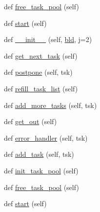 \begin{DoxyCompactItemize}
\item 
def \hyperlink{classwaflib_1_1_runner_1_1_parallel_aed9785fdb3b1d54bbdc5520942ebe237}{free\+\_\+task\+\_\+pool} (self)
\item 
def \hyperlink{classwaflib_1_1_runner_1_1_parallel_a091adebadfabd759640c7347de4b05e2}{start} (self)
\item 
def \hyperlink{classwaflib_1_1_runner_1_1_parallel_a0c0a52852b556178d86233e354383f51}{\+\_\+\+\_\+init\+\_\+\+\_\+} (self, \hyperlink{classwaflib_1_1_runner_1_1_parallel_a710f2069db915f1b04538ed7989511ff}{bld}, j=2)
\item 
def \hyperlink{classwaflib_1_1_runner_1_1_parallel_a13620afd7fb0dac47215c1a434c3a79a}{get\+\_\+next\+\_\+task} (self)
\item 
def \hyperlink{classwaflib_1_1_runner_1_1_parallel_ab025fd073c2f52e72df1a3bc8d188d0e}{postpone} (self, tsk)
\item 
def \hyperlink{classwaflib_1_1_runner_1_1_parallel_a2f7785b4be91f45b53a9f294fb3a990e}{refill\+\_\+task\+\_\+list} (self)
\item 
def \hyperlink{classwaflib_1_1_runner_1_1_parallel_a7501769205be6d24343c054f46e43289}{add\+\_\+more\+\_\+tasks} (self, tsk)
\item 
def \hyperlink{classwaflib_1_1_runner_1_1_parallel_aa5803cc70ce58b6f1ed09d8e4414aeef}{get\+\_\+out} (self)
\item 
def \hyperlink{classwaflib_1_1_runner_1_1_parallel_a5687053d52ada326ac8754dc15bd5138}{error\+\_\+handler} (self, tsk)
\item 
def \hyperlink{classwaflib_1_1_runner_1_1_parallel_a7b6dec41418a4eb5a39aa35756ef39c6}{add\+\_\+task} (self, tsk)
\item 
def \hyperlink{classwaflib_1_1_runner_1_1_parallel_a847fede29cb9dfe31b6b694e1044d100}{init\+\_\+task\+\_\+pool} (self)
\item 
def \hyperlink{classwaflib_1_1_runner_1_1_parallel_aed9785fdb3b1d54bbdc5520942ebe237}{free\+\_\+task\+\_\+pool} (self)
\item 
def \hyperlink{classwaflib_1_1_runner_1_1_parallel_a091adebadfabd759640c7347de4b05e2}{start} (self)
\end{DoxyCompactItemize}
